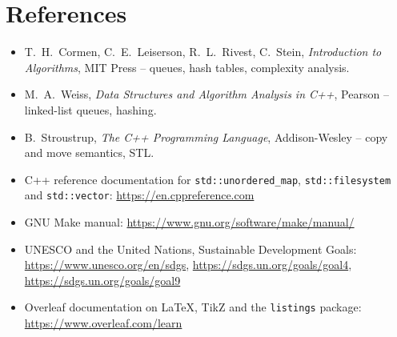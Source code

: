 \documentclass[12pt,a4paper]{report}
\begin{document}
\chapter{References}
\begin{itemize}
  \item T.~H.~Cormen, C.~E.~Leiserson, R.~L.~Rivest, C.~Stein, \textit{Introduction to Algorithms}, MIT Press -- queues, hash tables, complexity analysis.
  \item M.~A.~Weiss, \textit{Data Structures and Algorithm Analysis in C++}, Pearson -- linked-list queues, hashing.
  \item B.~Stroustrup, \textit{The C++ Programming Language}, Addison-Wesley -- copy and move semantics, STL.
  \item C++ reference documentation for \texttt{std::unordered\_map}, \texttt{std::filesystem} and \texttt{std::vector}: \url{https://en.cppreference.com}
  \item GNU Make manual: \url{https://www.gnu.org/software/make/manual/}
  \item UNESCO and the United Nations, Sustainable Development Goals: \url{https://www.unesco.org/en/sdgs}, \url{https://sdgs.un.org/goals/goal4}, \url{https://sdgs.un.org/goals/goal9}
  \item Overleaf documentation on \LaTeX, TikZ and the \texttt{listings} package: \url{https://www.overleaf.com/learn}
\end{itemize}
\end{document}
